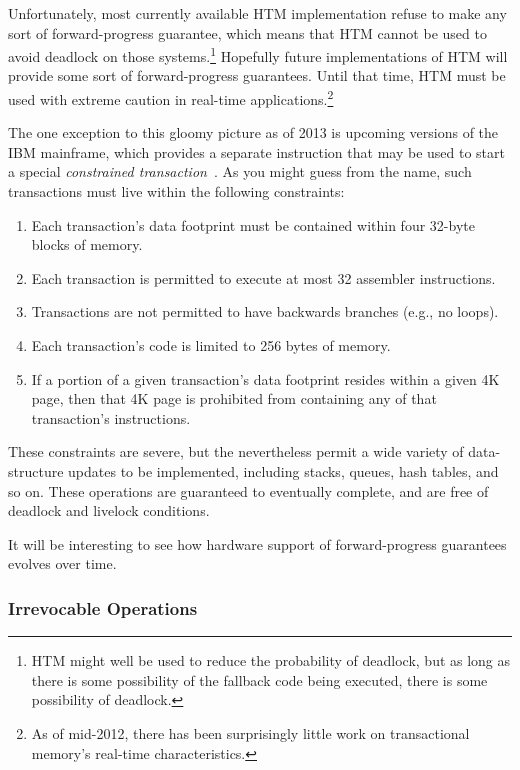 Unfortunately, most currently available HTM implementation refuse to
make any
sort of forward-progress guarantee, which means that HTM cannot be
used to avoid deadlock on those systems.\footnote{
	HTM might well be used to reduce the probability of deadlock,
	but as long as there is some possibility of the fallback
	code being executed, there is some possibility of deadlock.}
Hopefully future implementations of HTM will provide some sort of
forward-progress guarantees.
Until that time, HTM must be used with extreme caution in real-time
applications.\footnote{
	As of mid-2012, there has been surprisingly little work on
	transactional memory's real-time characteristics.}

The one exception to this gloomy picture as of 2013 is upcoming versions
of the IBM mainframe, which provides a separate instruction that may be
used to start a special
\emph{constrained transaction}~\cite{ChristianJacobi2012MainframeTM}.
As you might guess from the name, such transactions must live within
the following constraints:

\begin{enumerate}
\item	Each transaction's data footprint must be contained within
	four 32-byte blocks of memory.
\item	Each transaction is permitted to execute at most 32 assembler
	instructions.
\item	Transactions are not permitted to have backwards branches
	(e.g., no loops).
\item	Each transaction's code is limited to 256 bytes of memory.
\item	If a portion of a given transaction's data footprint resides
	within a given 4K page, then that 4K page is prohibited from
	containing any of that transaction's instructions.
\end{enumerate}

These constraints are severe, but the nevertheless permit a wide variety
of data-structure updates to be implemented, including stacks, queues,
hash tables, and so on.
These operations are guaranteed to eventually complete, and are free of
deadlock and livelock conditions.

It will be interesting to see how hardware support of forward-progress
guarantees evolves over time.

\subsubsection{Irrevocable Operations}
\label{sec:future:Irrevocable Operations}

